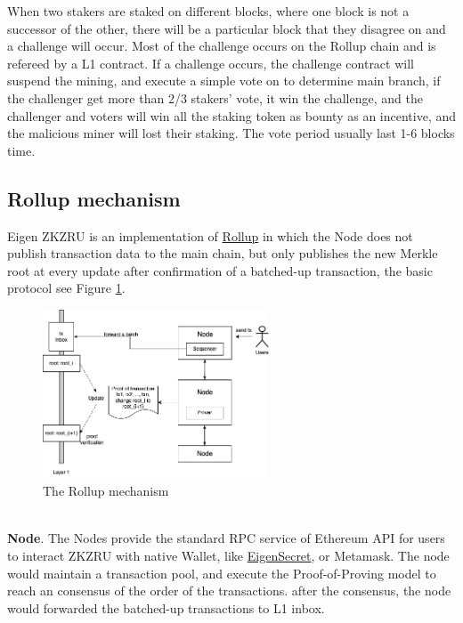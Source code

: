 \documentclass{article}
\begin{document}
When two stakers are staked on different blocks, where one block is not a successor of the other, there will be a particular block that they disagree on and a challenge will occur. Most of the challenge occurs on the Rollup chain and is refereed by a L1 contract. If a challenge occurs, the challenge contract will suspend the mining, and execute a simple vote on to determine main branch, if the challenger get more than 2/3 stakers' vote, it win the challenge, and the challenger and voters will win all the staking token as bounty as an incentive, and the malicious miner will lost their staking. The vote period usually last 1-6 blocks time.

\subsection{Rollup mechanism}

Eigen ZKZRU is an implementation of \href{https://vitalik.ca/general/2021/01/05/rollup.html}{Rollup} in which the Node does not publish transaction data to the main chain, but only publishes the new Merkle root at every update after confirmation of a batched-up transaction, the basic protocol see Figure \ref{fig:rollup}.

\begin{figure}
    \centering
    \includegraphics[width=0.6\textwidth]{arch2.drawio.png}
    \caption{\label{fig:rollup}The Rollup mechanism}
\end{figure}

~\\
\noindent\textbf{Node}. The Nodes provide the standard RPC service of Ethereum API for users to interact ZKZRU with native Wallet, like \href{https://secret.eigen.cash}{EigenSecret}, or Metamask. The node would maintain a transaction pool, and execute the Proof-of-Proving model to reach an consensus of the order of the transactions. after the consensus, the node would forwarded the batched-up transactions to L1 inbox. 
\end{document}
